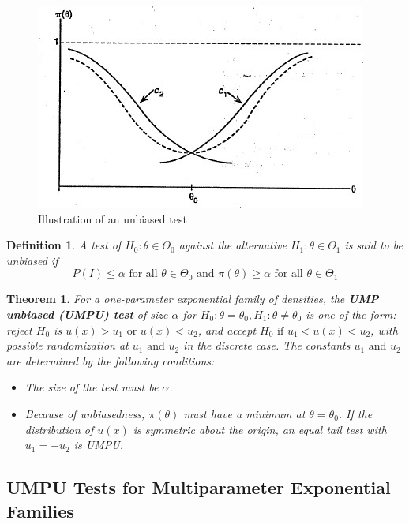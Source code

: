 \documentclass{article}
\newtheorem{definition}{Definition}[section]
\newtheorem{theorem}{Theorem}[section]
\begin{document}
\begin{figure} [H]
    \centering
    \includegraphics{pics/unbiased.jpg}
    \caption{Illustration of an unbiased test}
    \label{fig:enter-label989}
\end{figure}

\begin{definition}
    A test of \(H_0:\theta \in \Theta_0\) against the alternative \(H_1:\theta \in \Theta_1\) is said to be unbiased if
    \begin{equation*}
        P(I) \leq \alpha \text{ for all } \theta \in \Theta_0 \text{ and } \pi(\theta)\geq \alpha \text{ for all } \theta \in \Theta_1
        \end{equation*}
\end{definition}

\begin{theorem}
    For a one-parameter exponential family of densities, the \textbf{UMP unbiased (UMPU) test} of size \(\alpha\) for \(H_0:\theta=\theta_0,H_1:\theta \neq \theta_0\) is one of the form: reject \(H_0\) is \(u(x)>u_1 \text{ or } u(x)<u_2\), and accept \(H_0 \text{ if } u_1<u(x)<u_2\), with possible randomization at \(u_1 \text{ and } u_2\) in the discrete case. The constants \(u_1 \text{ and } u_2\) are determined by the following conditions:
    \begin{itemize}
        \item The size of the test must be $\alpha$.
        \item Because of unbiasedness, \(\pi(\theta)\) must have a minimum at \(\theta=\theta_0\). If the distribution of \(u(x)\) is symmetric about the origin, an equal tail test with \(u_1=-u_2\) is UMPU.
    \end{itemize}
\end{theorem}


\subsection{UMPU Tests for Multiparameter Exponential Families}
\end{document}
